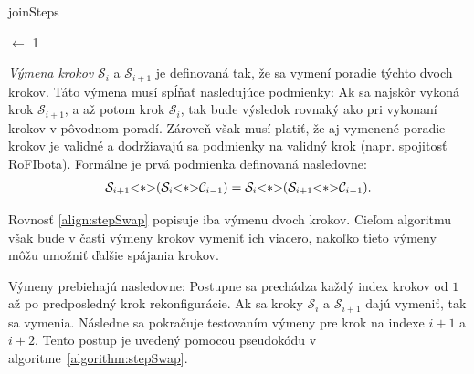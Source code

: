 \documentclass[
  printed, %
  oneside, %
  notable,   %
  nolof,     %
  nolot,     %
]{fithesis3}
\begin{document}
\begin{algorithm}
    \caption{joinSteps}
    \label{algorithm:stepJoin}
    \DontPrintSemicolon
    
    \CurrIndex $\leftarrow$ 1\;
\end{algorithm}

\textit{Výmena krokov} $\mathcal{S}_i$ a $\mathcal{S}_{i + 1}$ je definovaná tak, že sa vymení poradie týchto dvoch krokov. Táto výmena musí spĺňať nasledujúce podmienky: Ak sa najskôr vykoná krok $\mathcal{S}_{i + 1}$, a až potom krok $\mathcal{S}_i$, tak bude výsledok rovnaký ako pri vykonaní krokov v pôvodnom poradí. Zároveň však musí platiť, že aj vymenené poradie krokov je validné a dodržiavajú sa podmienky na validný krok (napr. spojitosť RoFIbota). Formálne je prvá podmienka definovaná nasledovne: 
\begin{align}
\label{align:stepSwap}
\mathcal{S}_{i + 1} \lstinline{<*>} (\mathcal{S}_i \lstinline{<*>} \mathcal{C}_{i - 1}) = \mathcal{S}_i \lstinline{<*>} (\mathcal{S}_{i + 1} \lstinline{<*>} \mathcal{C}_{i - 1}). 
\end{align}

Rovnosť \ref{align:stepSwap} popisuje iba výmenu dvoch krokov. Cieľom algoritmu však bude v časti výmeny krokov vymeniť ich viacero, nakoľko tieto výmeny môžu umožniť ďalšie spájania krokov. 

Výmeny prebiehajú nasledovne: Postupne sa prechádza každý index krokov od $1$ až po predposledný krok rekonfigurácie. Ak sa kroky $\mathcal{S}_i$ a $\mathcal{S}_{i + 1}$ dajú vymeniť, tak sa vymenia. Následne sa pokračuje testovaním výmeny pre krok na indexe $i + 1$ a $i + 2$. Tento postup je uvedený pomocou pseudokódu v algoritme~\ref{algorithm:stepSwap}. 
\end{document}
